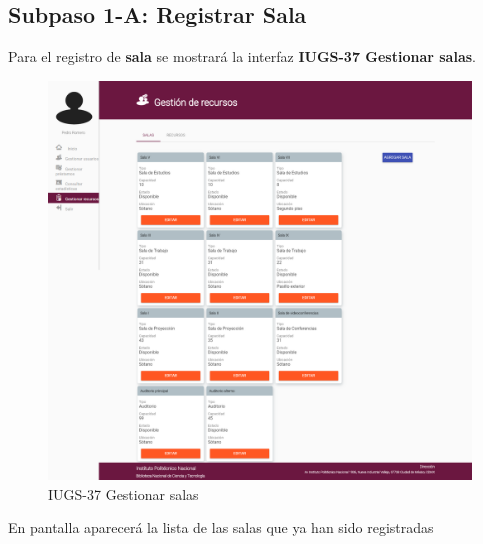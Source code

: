 \subsection{Subpaso 1-A: Registrar Sala}
	Para el registro de \textbf{sala} se mostrará la interfaz
	\textbf{IUGS-37 Gestionar salas}.\par
		\begin{figure}[hbtp]	
			\centering
				\includegraphics[scale=0.3]{images/Interfaz/IUGS37_GestionarSalas.png}
				\caption{IUGS-37 Gestionar salas}
		\end{figure}
	En pantalla aparecerá la lista de las salas que ya han sido registradas	
